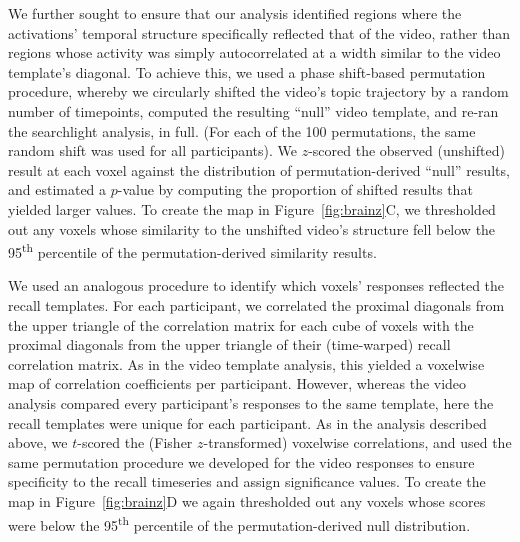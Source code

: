 \documentclass{article}
\begin{document}
We further sought to ensure that our analysis identified regions where the activations’ temporal structure specifically reflected that of the video, rather than regions whose activity was simply autocorrelated at a width similar to the video template’s diagonal.  To achieve this, we used a phase shift-based permutation procedure, whereby we circularly shifted the video’s topic trajectory by a random number of timepoints, computed the resulting ``null” video template, and re-ran the searchlight analysis, in full.  (For each of the 100 permutations, the same random shift was used for all participants).  We $z$-scored the observed (unshifted) result at each voxel against the distribution of permutation-derived ``null” results, and estimated a $p$-value by computing the proportion of shifted results that yielded larger values.  To create the map in Figure~\ref{fig:brainz}C, we thresholded out any voxels whose similarity to the unshifted video’s structure fell below the 95\textsuperscript{th} percentile of the permutation-derived similarity results.

We used an analogous procedure to identify which voxels' responses reflected the recall templates.  For each participant, we correlated the proximal diagonals from the upper triangle of the correlation matrix for each cube of voxels with the proximal diagonals from the upper triangle of their (time-warped) recall correlation matrix.  As in the video template analysis, this yielded a voxelwise map of correlation coefficients per participant.  However, whereas the video analysis compared every participant's responses to the same template, here the recall templates were unique for each participant.  As in the analysis described above, we $t$-scored the (Fisher $z$-transformed) voxelwise correlations, and used the same permutation procedure we developed for the video responses to ensure specificity to the recall timeseries and assign significance values.  To create the map in Figure~\ref{fig:brainz}D we again thresholded out any voxels whose scores were below the 95\textsuperscript{th} percentile of the permutation-derived null distribution.
\end{document}
